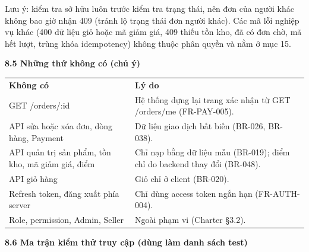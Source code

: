 \documentclass[11pt,a4paper,oneside]{report}
\begin{document}
Lưu ý: kiểm tra sở hữu luôn trước kiểm tra trạng thái, nên đơn của người khác không bao giờ nhận 409 (tránh lộ trạng thái đơn người khác). Các mã lỗi nghiệp vụ khác (400 dữ liệu giỏ hoặc mã giảm giá, 409 thiếu tồn kho, đã có đơn chờ, mã hết lượt, trùng khóa idempotency) không thuộc phân quyền và nằm ở mục 15.

\textbf{8.5 Những thứ không có (chủ ý)}

\begin{longtable}[]{@{}
  >{\raggedright\arraybackslash}p{}
  >{\raggedright\arraybackslash}p{}@{}}
\toprule\noalign{}
\endhead
\bottomrule\noalign{}
\endlastfoot
\textbf{Không có} & \textbf{Lý do} \\
GET /orders/:id & Hệ thống dựng lại trang xác nhận từ GET /orders/me (FR-PAY-005). \\
API sửa hoặc xóa đơn, dòng hàng, Payment & Dữ liệu giao dịch bất biến (BR-026, BR-038). \\
API quản trị sản phẩm, tồn kho, mã giảm giá, điểm & Chỉ nạp bằng dữ liệu mẫu (BR-019); điểm chỉ do backend thay đổi (BR-048). \\
API giỏ hàng & Giỏ chỉ ở client (BR-020). \\
Refresh token, đăng xuất phía server & Chỉ dùng access token ngắn hạn (FR-AUTH-004). \\
Role, permission, Admin, Seller & Ngoài phạm vi (Charter §3.2). \\
\end{longtable}

\textbf{8.6 Ma trận kiểm thử truy cập (dùng làm danh sách test)}
\end{document}
